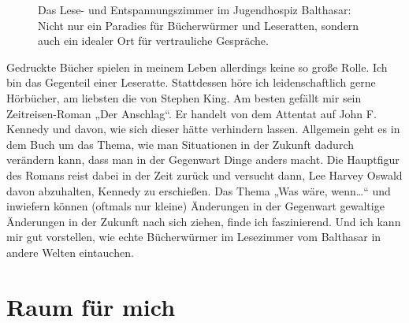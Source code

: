 \documentclass[fontsize=14pt,a4paper,headinclude,DIV=calc,automark]{scrbook}
\begin{document}
\setlength{\fboxsep}{0pt}    %
\setlength{\fboxrule}{0.2pt} %
\begin{figure}[ht]
    \raggedright
    \caption{Das Lese- und Entspannungszimmer im Jugendhospiz Balthasar: Nicht nur ein Paradies für Bücherwürmer und Leseratten, sondern auch ein idealer Ort für vertrauliche Gespräche.}
    \label{fig:lese_und_entspannungszimmer}
\end{figure}

Gedruckte Bücher spielen in meinem Leben allerdings keine so große Rolle. Ich bin das Gegenteil einer Leseratte. Stattdessen höre ich leidenschaftlich gerne Hörbücher, am liebsten die von Stephen King. Am besten gefällt mir sein Zeitreisen-Roman „Der Anschlag“. Er handelt von dem Attentat auf John F. Kennedy und davon, wie sich dieser hätte verhindern lassen. Allgemein geht es in dem Buch um das Thema, wie man Situationen in der Zukunft dadurch verändern kann, dass man in der Gegenwart Dinge anders macht. Die Hauptfigur des Romans reist dabei in der Zeit zurück und versucht dann, Lee Harvey Oswald davon abzuhalten, Kennedy zu erschießen. Das Thema „Was wäre, wenn…“ und inwiefern können (oftmals nur kleine) Änderungen in der Gegenwart gewaltige Änderungen in der Zukunft nach sich ziehen, finde ich faszinierend. Und ich kann mir gut vorstellen, wie echte Bücherwürmer im Lesezimmer vom Balthasar in andere Welten eintauchen.

\section{Raum für mich}
\end{document}
